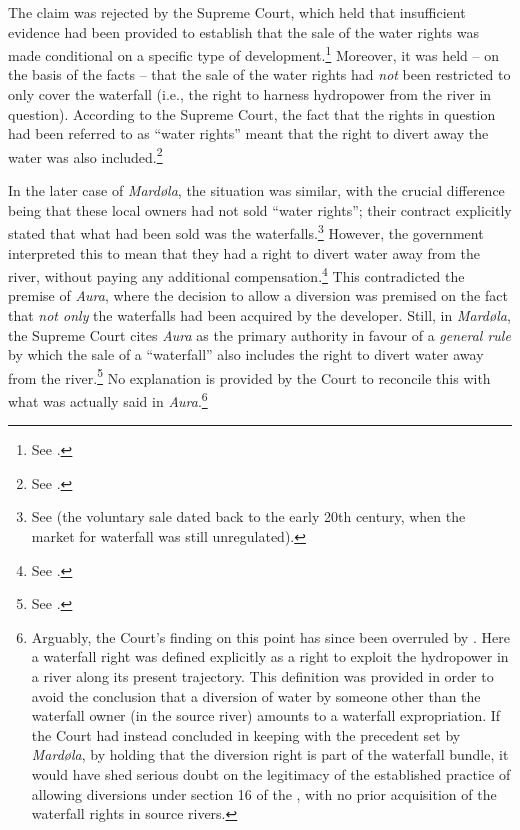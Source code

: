 The claim was rejected by the Supreme Court, which held that insufficient evidence had been provided to establish that the sale of the water rights was made conditional on a specific type of development.\footnote{See \cite[1285-1286]{aura61}.} Moreover, it was held -- on the basis of the facts -- that the sale of the water rights had {\it not} been restricted to only cover the waterfall (i.e., the right to harness hydropower from the river in question). According to the Supreme Court, the fact that the rights in question had been referred to as ``water rights'' meant that the right to divert away the water was also included.\footnote{See \cite[1284-1285]{aura61}.}

In the later case of {\it Mardøla}, the situation was similar, with the crucial difference being that these local owners had not sold ``water rights''; their contract explicitly stated that what had been sold was the waterfalls.\footnote{See \cite[112]{mardola73} (the voluntary sale dated back to the early 20th century, when the market for waterfall was still unregulated).} However, the government interpreted this to mean that they had a right to divert water away from the river, without paying any additional compensation.\footnote{See \cite[112]{mardola73}.} This contradicted the premise of {\it Aura}, where the decision to allow a diversion was premised on the fact that {\it not only} the waterfalls had been acquired by the developer. Still, in {\it Mardøla}, the Supreme Court cites {\it Aura} as the primary authority in favour of a {\it general rule} by which the sale of a ``waterfall'' also includes the right to divert water away from the river.\footnote{See \cite[112]{mardola73}.} No explanation is provided by the Court to reconcile this with what was actually said in {\it Aura}.\footnote{Arguably, the Court's finding on this point has since been overruled by \cite{jorpeland11}. Here a waterfall right was defined explicitly as a right to exploit the hydropower in a river along its present trajectory. This definition was provided in order to avoid the conclusion that a diversion of water by someone other than the waterfall owner (in the source river) amounts to a waterfall expropriation. If the Court had instead concluded in keeping with the precedent set by {\it Mardøla}, by holding that the diversion right is part of the waterfall bundle, it would have shed serious doubt on the legitimacy of the established practice of allowing diversions under section 16 of the \cite{wra17}, with no prior acquisition of the waterfall rights in source rivers.}


